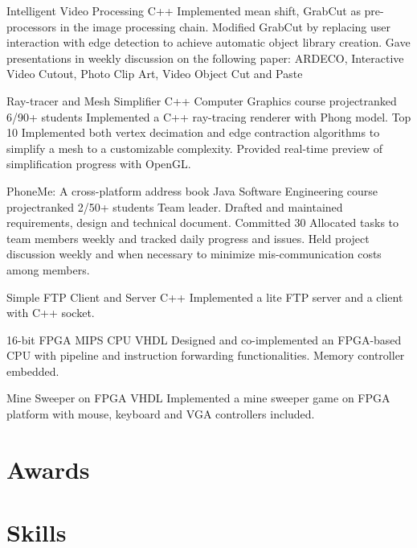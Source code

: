 \documentclass[11pt,a4paper]{moderncv}
\begin{document}
{Intelligent Video Processing}
{C++}
{}{}
{
Implemented mean shift, GrabCut as pre-processors in the image processing chain.
Modified GrabCut by replacing user interaction with edge detection to achieve automatic object library creation.
Gave presentations in weekly discussion on the following paper: ARDECO, Interactive Video Cutout, Photo Clip Art, Video Object Cut and Paste
}

{Ray-tracer and Mesh Simplifier}
{C++}
{Computer Graphics course project}{ranked 6/90+ students}
{
Implemented a C++ ray-tracing renderer with Phong model.
Top 10%
Implemented both vertex decimation and edge contraction algorithms to simplify a mesh to a customizable complexity.
Provided real-time preview of simplification progress with OpenGL.
}

{PhoneMe: A cross-platform address book}
{Java}
{Software Engineering course project}{ranked 2/50+ students}
{
Team leader.
Drafted and maintained requirements, design and technical document.
Committed 30%
Allocated tasks to team members weekly and tracked daily progress and issues.
Held project discussion weekly and when necessary to minimize mis-communication
costs among members.
}

{Simple FTP Client and Server}
{C++}
{}{}
{
Implemented a lite FTP server and a client with C++ socket.
}

{16-bit FPGA MIPS CPU}
{VHDL}
{}{}
{
Designed and co-implemented an FPGA-based CPU with pipeline and instruction forwarding functionalities. Memory controller embedded.
}

{Mine Sweeper on FPGA}
{VHDL}
{}{}
{
Implemented a mine sweeper game on FPGA platform with mouse, keyboard and VGA controllers included.
}



\nocite{*}


\section{Awards}


\section{Skills}
\end{document}
